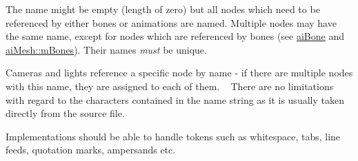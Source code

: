 The name might be empty (length of zero) but all nodes which need to be referenced by either bones or animations are named. Multiple nodes may have the same name, except for nodes which are referenced by bones (see \hyperlink{structai_bone}{ai\+Bone} and \hyperlink{structai_mesh_a0c0582a7f45b340b6a33552c53232539}{ai\+Mesh\+::m\+Bones}). Their names {\itshape must} be unique.

Cameras and lights reference a specific node by name -\/ if there are multiple nodes with this name, they are assigned to each of them. ~\newline
 There are no limitations with regard to the characters contained in the name string as it is usually taken directly from the source file.

Implementations should be able to handle tokens such as whitespace, tabs, line feeds, quotation marks, ampersands etc.


